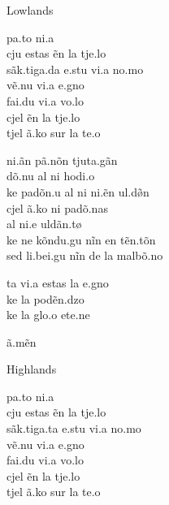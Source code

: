 \begin{multicols*}{2}

{\sc Lowlands}

\prstr pa.t\alvrap o \prstr ni.\paljfric a\\
\prstr cju e\prstr stas ẽn la \prstr t\tiebar\esh je.lo\\
\scstr sã\engma k.ti\prstr ga.da \prstr e.stu \prstr vi.\paljfric a \prstr no.mo\\
\prstr vẽ.nu \prstr vi.\paljfric a \prstr\alvrap e.gno\\
fa\prstr\alvrap i.d\tiebar\ezh u \prstr vi.\paljfric a \prstr vo.lo\\
cjel ẽn la \prstr t\tiebar\esh je.lo\\
tjel \prstr ã\engma.ko\lgth{} sur la \prstr te.\alvrap o

\prstr ni.\paljfric ãn \prstr pã.nõn \scstr t\tiebar\esh ju\prstr ta.gãn\\
\prstr dõ.nu al ni ho\prstr di.\paljfric o\lgth{}\\
ke\lgth{} pa\alvrap\prstr dõn.u al ni \prstr ni.\paljfric ẽ\lgth{}n \prstr\esh ul.dø̃\lgth{}n\\
cjel \prstr ã\engma.ko\lgth{} ni pa\alvrap\prstr dõ.nas\\
al \prstr ni.\paljfric e\lgth{} \esh ul\prstr dãn.tø\lgth{}\\
ke\lgth{} ne kõn\prstr du.gu nĩn en \prstr tẽn.tõn\\
sed \scstr li.be\prstr\alvrap i.gu nĩn de la mal\prstr bõ.no

t\tiebar\esh a\alvrap{} \prstr vi.\paljfric a e\prstr stas la \prstr \alvrap e.gno\\
ke\lgth{} la po\prstr dẽn.d\tiebar zo\\
ke\lgth{} la \prstr glo.\alvrap o e\prstr te\alvrap.ne

\prstr ã.mẽn

\columnbreak

{\sc Highlands}

\prstr pa.t\alvrap o \prstr ni.\paljfric a\\
\prstr cju e\prstr stas ẽn la \prstr t\tiebar\esh je.lo\\
\scstr sã\engma k.ti\prstr ga.ta \prstr e.stu \prstr vi.\paljfric a \prstr no.mo\\
\prstr vẽ.nu \prstr vi.\paljfric a \prstr\alvrap e.gno\\
fa\prstr\alvrap i.d\tiebar\ezh u \prstr vi.\paljfric a \prstr vo.lo\\
cjel ẽn la \prstr t\tiebar\esh je.lo\\
tjel \prstr ã\engma.ko\lgth{} sur la \prstr te.\alvrap o


\end{multicols*}
